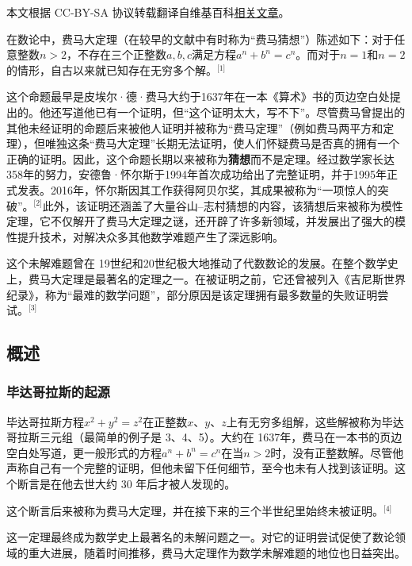 
本文根据 CC-BY-SA 协议转载翻译自维基百科\href{https://en.wikipedia.org/wiki/Fermat\%27s_Last_Theorem}{相关文章}。

在数论中，费马大定理（在较早的文献中有时称为“费马猜想”）陈述如下：对于任意整数\( n > 2 \)，不存在三个正整数\( a, b, c \)满足方程\( a^n + b^n = c^n \)。而对于\( n = 1 \)和\( n = 2 \)的情形，自古以来就已知存在无穷多个解。\(^\text{[1]}\)

这个命题最早是皮埃尔·德·费马大约于1637年在一本《算术》书的页边空白处提出的。他还写道他已有一个证明，但“这个证明太大，写不下”。尽管费马曾提出的其他未经证明的命题后来被他人证明并被称为“费马定理”（例如费马两平方和定理），但唯独这条“费马大定理”长期无法证明，使人们怀疑费马是否真的拥有一个正确的证明。因此，这个命题长期以来被称为\textbf{猜想}而不是定理。经过数学家长达358年的努力，安德鲁·怀尔斯于1994年首次成功给出了完整证明，并于1995年正式发表。2016年，怀尔斯因其工作获得阿贝尔奖，其成果被称为“一项惊人的突破”。\(^\text{[2]}\)此外，该证明还涵盖了大量谷山–志村猜想的内容，该猜想后来被称为模性定理，它不仅解开了费马大定理之谜，还开辟了许多新领域，并发展出了强大的模性提升技术，对解决众多其他数学难题产生了深远影响。

这个未解难题曾在 19世纪和20世纪极大地推动了代数数论的发展。在整个数学史上，费马大定理是最著名的定理之一。在被证明之前，它还曾被列入《吉尼斯世界纪录》，称为“最难的数学问题”，部分原因是该定理拥有最多数量的失败证明尝试。\(^\text{[3]}\)
\subsection{概述}  
\subsubsection{毕达哥拉斯的起源}
毕达哥拉斯方程\(x^2 + y^2 = z^2\)在正整数\(x\)、\(y\)、\(z\)上有无穷多组解，这些解被称为毕达哥拉斯三元组（最简单的例子是 3、4、5）。大约在 1637年，费马在一本书的页边空白处写道，更一般形式的方程\(a^n + b^n = c^n\)在当\(n > 2\)时，没有正整数解。尽管他声称自己有一个完整的证明，但他未留下任何细节，至今也未有人找到该证明。这个断言是在他去世大约 30 年后才被人发现的。

这个断言后来被称为费马大定理，并在接下来的三个半世纪里始终未被证明。\(^\text{[4]}\)

这一定理最终成为数学史上最著名的未解问题之一。对它的证明尝试促使了数论领域的重大进展，随着时间推移，费马大定理作为数学未解难题的地位也日益突出。
